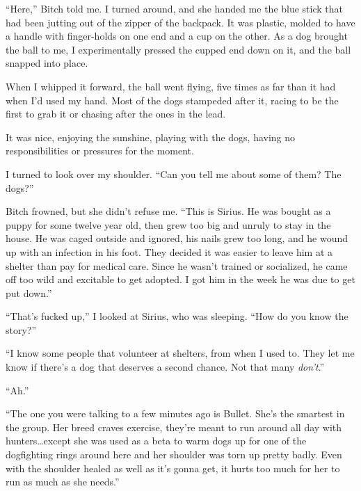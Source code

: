 ``Here,'' Bitch told me.  I turned around, and she handed me the blue stick that had been jutting out of the zipper of the backpack.  It was plastic, molded to have a handle with finger-holds on one end and a cup on the other.  As a dog brought the ball to me, I experimentally pressed the cupped end down on it, and the ball snapped into place.



When I whipped it forward, the ball went flying, five times as far than it had when I'd used my hand.  Most of the dogs stampeded after it, racing to be the first to grab it or chasing after the ones in the lead.



It was nice, enjoying the sunshine, playing with the dogs, having no responsibilities or pressures for the moment.



I turned to look over my shoulder.  ``Can you tell me about some of them?  The dogs?''



Bitch frowned, but she didn't refuse me.  ``This is Sirius.  He was bought as a puppy for some twelve year old, then grew too big and unruly to stay in the house.  He was caged outside and ignored, his nails grew too long, and he wound up with an infection in his foot.  They decided it was easier to leave him at a shelter than pay for medical care.  Since he wasn't trained or socialized, he came off too wild and excitable to get adopted.  I got him in the week he was due to get put down.''



``That's fucked up,'' I looked at Sirius, who was sleeping.  ``How do you know the story?''



``I know some people that volunteer at shelters, from when I used to.  They let me know if there's a dog that deserves a second chance.  Not that many \emph{don't}.''



``Ah.''



``The one you were talking to a few minutes ago is Bullet.  She's the smartest in the group.  Her breed craves exercise, they're meant to run around all day with hunters\ldots except she was used as a beta to warm dogs up for one of the dogfighting rings around here and her shoulder was torn up pretty badly.  Even with the shoulder healed as well as it's gonna get, it hurts too much for her to run as much as she needs.''



